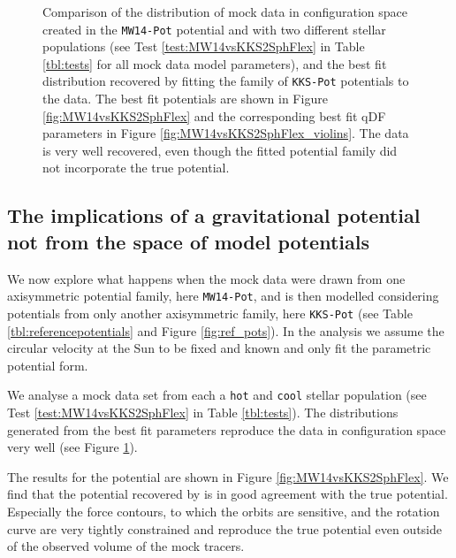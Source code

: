 \begin{figure}[!htbp]
\caption{Comparison of the distribution of mock data in configuration space created in the \texttt{MW14-Pot} potential and with two different stellar populations (see Test \ref{test:MW14vsKKS2SphFlex} in Table \ref{tbl:tests} for all mock data model parameters), and the best fit distribution recovered by fitting the family of \texttt{KKS-Pot} potentials to the data. The best fit potentials are shown in Figure \ref{fig:MW14vsKKS2SphFlex} and the corresponding best fit qDF parameters in Figure \ref{fig:MW14vsKKS2SphFlex_violins}. The data is very well recovered, even though the fitted potential family did not incorporate the true potential.}
\label{fig:MW14vsKKS2SphFlex_mockdata_residuals}
\end{figure}





\subsection{The implications of a gravitational potential not from the space of model potentials} \label{sec:results_potential}


We now explore what happens when the mock data were drawn from one axisymmetric potential family, here \texttt{MW14-Pot}, and is then modelled considering potentials from only another axisymmetric family, here \texttt{KKS-Pot} (see Table \ref{tbl:referencepotentials} and Figure \ref{fig:ref_pots}). In the analysis we assume the circular velocity at the Sun to be fixed and known and only fit the parametric potential form. 



We analyse a mock data set from each a \texttt{hot} and \texttt{cool} stellar population (see Test \ref{test:MW14vsKKS2SphFlex} in Table \ref{tbl:tests}). The distributions generated from the best fit parameters reproduce the data in configuration space very well (see Figure \ref{fig:MW14vsKKS2SphFlex_mockdata_residuals}).

The results for the potential are shown in Figure \ref{fig:MW14vsKKS2SphFlex}. We find that the potential recovered by \RM{} is in good agreement with the true potential. Especially the force contours, to which the orbits are sensitive, and the rotation curve are very tightly constrained and reproduce the true potential even outside of the observed volume of the mock tracers.

